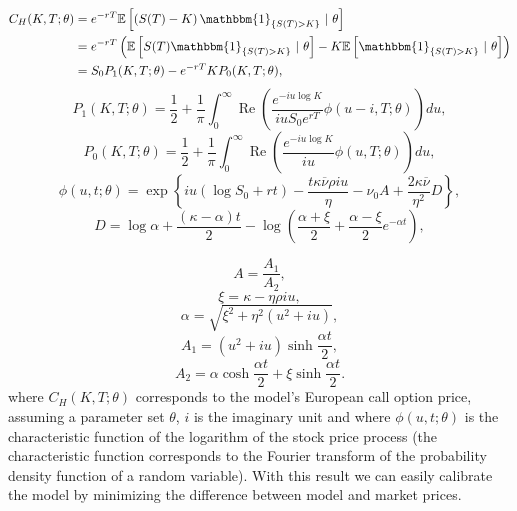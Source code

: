 \begin{strip2}
\begin{equation}\label{CH}
\begin{split}
C_{H}(K,T;\theta)&=e^{-rT}\mathbb{E}\left[\left(S(T)-K\right)\mathbbm{1}_{\left\{S(T)>K\right\}}\ \vert\ \theta\right]\\
&=e^{-rT}\left(\mathbb{E}\left[S(T)\mathbbm{1}_{\left\{S(T)>K\right\}}\ \vert\ \theta\right]-K\mathbb{E}\left[\mathbbm{1}_{\left\{S(T)>K\right\}}\ \vert\ \theta\right]\right)\\
&=S_0P_1(K,T;\theta)-e^{-rT}KP_0(K,T;\theta),
\end{split}
\end{equation}
\begin{equation}\label{P1}
P_1(K,T;\theta)=\frac{1}{2}+\frac{1}{\pi}\int_0^\infty\operatorname{Re}\left(\frac{e^{-iu\log K}}{iuS_0e^{rT}}\phi(u-i,T;\theta)\right)du,
\end{equation}
\begin{equation}\label{P2}
P_0(K,T;\theta)=\frac{1}{2}+\frac{1}{\pi}\int_0^\infty\operatorname{Re}\left(\frac{e^{-iu\log K}}{iu}\phi(u,T;\theta)\right)du,
\end{equation}
\begin{equation}
\phi(u,t;\theta)=\exp\left\{iu\left(\log S_0+rt\right)-\frac{t\kappa\overline{\nu}\rho iu}{\eta}-\nu_0A+\frac{2\kappa\overline{\nu}}{\eta^2}D\right\},
\end{equation}
\begin{equation}
D=\log \alpha+\frac{(\kappa-\alpha) t}{2}-\log\left(\frac{\alpha+\xi}{2}+\frac{\alpha-\xi}{2}e^{-\alpha t}\right),
\end{equation}
\end{strip2}
\begin{equation}
A=\frac{A_1}{A_2},
\end{equation}
\begin{equation}\label{xi}
\xi=\kappa-\eta\rho iu,
\end{equation}
\begin{equation}\label{alpha}
\alpha=\sqrt{\xi^2+\eta^2(u^2+iu)},
\end{equation}
\begin{equation}
A_1=(u^2+iu)\sinh\frac{\alpha t}{2},
\end{equation}
\begin{equation}
A_2=\alpha\cosh\frac{\alpha t}{2}+\xi\sinh\frac{\alpha t}{2}.
\end{equation}
\noindent where $C_{H}(K,T;\theta)$ corresponds to the model's European call option price, assuming a parameter set $\theta$, $i$ is the imaginary unit and where $\phi(u,t;\theta)$ is the characteristic function of the logarithm of the stock price process (the characteristic function corresponds to the Fourier transform of the probability density function of a random variable).
With this result we can easily calibrate the model by minimizing the difference between model and market prices.

